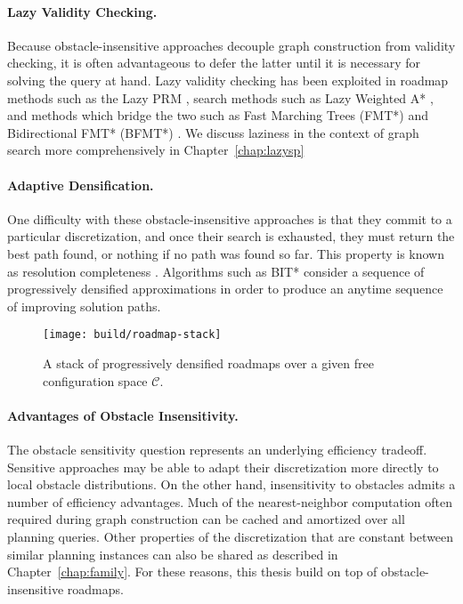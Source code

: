 \paragraph{Lazy Validity Checking.}
Because obstacle-insensitive approaches decouple graph construction
from validity checking,
it is often advantageous to defer the latter until it is
necessary for solving the query at hand.
Lazy validity checking has been exploited
in roadmap methods such as the Lazy PRM
\citep{bohlin2000lazyprm, hauser2015lazy},
search methods such as Lazy Weighted A* \citep{cohen2014narms},
and methods which bridge the two
such as Fast Marching Trees (FMT*) \citep{janson2015fmtstar}
and Bidirectional FMT* (BFMT*) \citep{starek2015bfmtstar}.
We discuss laziness in the context of graph search
more comprehensively in Chapter~\ref{chap:lazysp}

\paragraph{Adaptive Densification.}
One difficulty with these obstacle-insensitive approaches
is that they commit to a particular discretization,
and once their search is exhausted,
they must return the best path found,
or nothing if no path was found so far.
This property is known as resolution completeness
\citep{cheng2004rescomplete}.
Algorithms such as BIT* \citep{gammell2015bitstar}
consider a sequence of progressively densified approximations
in order to produce an anytime sequence of improving solution paths.


\begin{figure}
   \centering
   \texttt{[image: build/roadmap-stack]}
   \caption{A stack of progressively densified roadmaps
      over a given free configuration space $\mathcal{C}$.}
\end{figure}

\paragraph{Advantages of Obstacle Insensitivity.}
The obstacle sensitivity question represents an underlying efficiency
tradeoff.
Sensitive approaches may be able to adapt their discretization more
directly to local obstacle distributions.
On the other hand,
insensitivity to obstacles admits a number of efficiency advantages.
Much of the nearest-neighbor computation
often required during graph construction can be cached and amortized
over all planning queries.
Other properties of the discretization that are constant between
similar planning instances can also be shared
as described in Chapter~\ref{chap:family}.
For these reasons,
this thesis build on top of obstacle-insensitive roadmaps.

